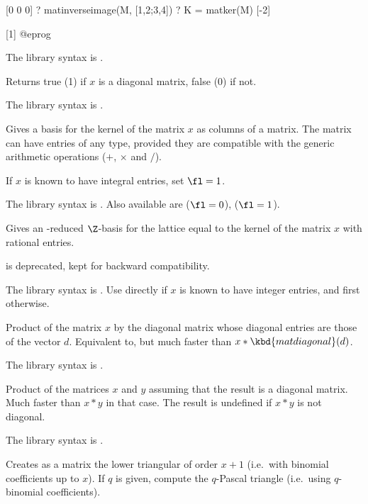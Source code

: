 [0 0 0]
? matinverseimage(M, [1,2;3,4])
? K = matker(M)
[-2]

[1]
@eprog

The library syntax is .

\label{se:matisdiagonal}
Returns true (1) if $x$ is a diagonal matrix, false (0) if not.

The library syntax is .

\label{se:matker}
Gives a basis for the kernel of the matrix $x$ as columns of a matrix.
The matrix can have entries of any type, provided they are compatible with
the generic arithmetic operations ($+$, $\times$ and $/$).

If $x$ is known to have integral entries, set $\fl=1$.

The library syntax is .
Also available are  ($\fl=0$),
 ($\fl=1$).

\label{se:matkerint}
Gives an -reduced $\Z$-basis
for the lattice equal to the kernel of the matrix $x$ with rational entries.

\fl is deprecated, kept for backward compatibility.

The library syntax is .
Use directly  if $x$ is known to have
integer entries, and  first otherwise.

\label{se:matmuldiagonal}
Product of the matrix $x$ by the diagonal
matrix whose diagonal entries are those of the vector $d$. Equivalent to,
but much faster than $x*\kbd{matdiagonal}(d)$.

The library syntax is .

\label{se:matmultodiagonal}
Product of the matrices $x$ and $y$ assuming that the result is a
diagonal matrix. Much faster than $x*y$ in that case. The result is
undefined if $x*y$ is not diagonal.

The library syntax is .

\label{se:matpascal}
Creates as a matrix the lower triangular
 of order $x+1$ (i.e.~with binomial coefficients
up to $x$). If $q$ is given, compute the $q$-Pascal triangle (i.e.~using
$q$-binomial coefficients).

